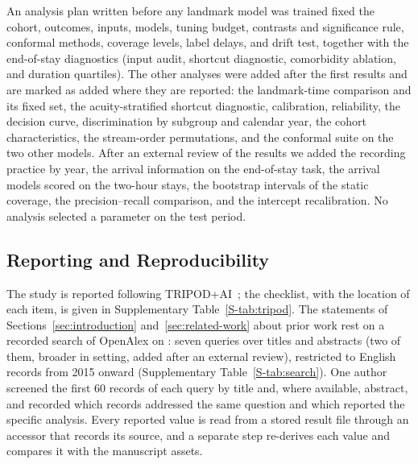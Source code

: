 An analysis plan written before any landmark model was trained fixed the cohort, outcomes, inputs, models, tuning budget, contrasts and significance rule,
conformal methods, coverage levels, label delays, and drift test, together with the end-of-stay diagnostics (input audit, shortcut diagnostic, comorbidity ablation,
and duration quartiles). The other analyses were added after the first results and are marked as added where they are reported: the landmark-time comparison and
its fixed set, the acuity-stratified shortcut diagnostic, calibration, reliability, the decision curve, discrimination by subgroup and calendar year, the cohort
characteristics, the stream-order permutations, and the conformal suite on the two other models. After an external review of the results we added the recording practice by year, the arrival information on the end-of-stay task, the arrival models scored on the two-hour stays, the bootstrap intervals of the static coverage, the precision--recall comparison, and the intercept recalibration. No analysis selected a parameter on the test period.

\subsection{Reporting and Reproducibility}
\label{sec:methods-reporting}

The study is reported following TRIPOD+AI~\cite{collins2024tripodai}; the checklist, with the location of each item, is given in Supplementary
Table~\ref{S-tab:tripod}. The statements of Sections~\ref{sec:introduction} and~\ref{sec:related-work} about prior work rest on a recorded search of OpenAlex on
\mbox{\RVLitDate{}}: seven queries over titles and abstracts (two of them, broader in setting, added after an external review), restricted to English records from 2015 onward (Supplementary Table~\ref{S-tab:search}). One author screened
the first 60 records of each query by title and, where available, abstract, and recorded which records addressed the same question and which reported the specific
analysis. Every reported value is read from a stored result file through an accessor that records its source, and a separate step re-derives each value and compares
it with the manuscript assets.
